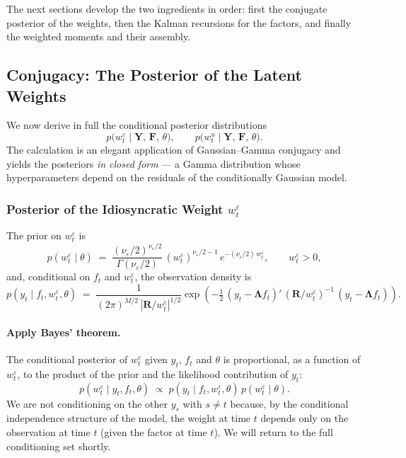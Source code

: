 \documentclass[11pt, a4paper, oneside]{article}
\newcommand{\mY}{\mathbf{Y}}
\newcommand{\mF}{\mathbf{F}}
\newcommand{\mL}{\boldsymbol{\Lambda}}
\newcommand{\mR}{\mathbf{R}}
\begin{document}
The next sections develop the two ingredients in order: first the
conjugate posterior of the weights, then the Kalman recursions for
the factors, and finally the weighted moments and their assembly.


\subsection{Conjugacy: The Posterior of the Latent Weights}
\label{subsec:weight-posterior}

We now derive in full the conditional posterior distributions
\[
p\big(w^\varepsilon_t \;\big|\; \mY,\, \mF,\, \theta\big),
\qquad
p\big(w^u_t \;\big|\; \mY,\, \mF,\, \theta\big).
\]
The calculation is an elegant application of Gaussian–Gamma conjugacy
and yields the posteriors \emph{in closed form} — a Gamma distribution
whose hyperparameters depend on the residuals of the conditionally
Gaussian model.

\subsubsection{Posterior of the Idiosyncratic Weight $w^\varepsilon_t$}

The prior on $w^\varepsilon_t$ is
\[
p(w^\varepsilon_t \mid \theta)
\;=\; \frac{(\nu_\varepsilon/2)^{\nu_\varepsilon/2}}{\Gamma(\nu_\varepsilon/2)}\,
(w^\varepsilon_t)^{\nu_\varepsilon/2 - 1}\, e^{-(\nu_\varepsilon/2)\, w^\varepsilon_t},
\qquad w^\varepsilon_t > 0,
\]
and, conditional on $f_t$ and $w^\varepsilon_t$, the observation density is
\[
p(y_t \mid f_t, w^\varepsilon_t, \theta)
\;=\; \frac{1}{(2\pi)^{M/2}\,|\mR/w^\varepsilon_t|^{1/2}}
\exp\!\left(-\tfrac{1}{2}\,(y_t - \mL f_t)'\,(\mR/w^\varepsilon_t)^{-1}\,(y_t - \mL f_t)\right).
\]

\paragraph{Apply Bayes' theorem.}
The conditional posterior of $w^\varepsilon_t$ given $y_t$, $f_t$ and
$\theta$ is proportional, as a function of $w^\varepsilon_t$, to the
product of the prior and the likelihood contribution of $y_t$:
\[
p(w^\varepsilon_t \mid y_t, f_t, \theta) \;\propto\;
p(y_t \mid f_t, w^\varepsilon_t, \theta)\,
p(w^\varepsilon_t \mid \theta).
\]
We are not conditioning on the other $y_s$ with $s \neq t$ because, by
the conditional independence structure of the model, the weight at
time $t$ depends only on the observation at time $t$ (given the factor
at time $t$). We will return to the full conditioning set shortly.
\end{document}
